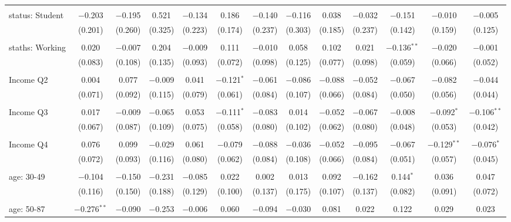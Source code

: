 \begin{tabular}{@{\extracolsep{5pt}}lcccccccccccc}
  & & & & & & & & & & & & \\ 
 status: Student & $-$0.203 & $-$0.195 & 0.521 & $-$0.134 & 0.186 & $-$0.140 & $-$0.116 & 0.038 & $-$0.032 & $-$0.151 & $-$0.010 & $-$0.005 \\ 
  & (0.201) & (0.260) & (0.325) & (0.223) & (0.174) & (0.237) & (0.303) & (0.185) & (0.237) & (0.142) & (0.159) & (0.125) \\ 
  & & & & & & & & & & & & \\ 
 staths: Working & 0.020 & $-$0.007 & 0.204 & $-$0.009 & 0.111 & $-$0.010 & 0.058 & 0.102 & 0.021 & $-$0.136$^{**}$ & $-$0.020 & $-$0.001 \\ 
  & (0.083) & (0.108) & (0.135) & (0.093) & (0.072) & (0.098) & (0.125) & (0.077) & (0.098) & (0.059) & (0.066) & (0.052) \\ 
  & & & & & & & & & & & & \\ 
 Income Q2 & 0.004 & 0.077 & $-$0.009 & 0.041 & $-$0.121$^{*}$ & $-$0.061 & $-$0.086 & $-$0.088 & $-$0.052 & $-$0.067 & $-$0.082 & $-$0.044 \\ 
  & (0.071) & (0.092) & (0.115) & (0.079) & (0.061) & (0.084) & (0.107) & (0.066) & (0.084) & (0.050) & (0.056) & (0.044) \\ 
  & & & & & & & & & & & & \\ 
 Income Q3 & 0.017 & $-$0.009 & $-$0.065 & 0.053 & $-$0.111$^{*}$ & $-$0.083 & 0.014 & $-$0.052 & $-$0.067 & $-$0.008 & $-$0.092$^{*}$ & $-$0.106$^{**}$ \\ 
  & (0.067) & (0.087) & (0.109) & (0.075) & (0.058) & (0.080) & (0.102) & (0.062) & (0.080) & (0.048) & (0.053) & (0.042) \\ 
  & & & & & & & & & & & & \\ 
 Income Q4 & 0.076 & 0.099 & $-$0.029 & 0.061 & $-$0.079 & $-$0.088 & $-$0.036 & $-$0.052 & $-$0.095 & $-$0.067 & $-$0.129$^{**}$ & $-$0.076$^{*}$ \\ 
  & (0.072) & (0.093) & (0.116) & (0.080) & (0.062) & (0.084) & (0.108) & (0.066) & (0.084) & (0.051) & (0.057) & (0.045) \\ 
  & & & & & & & & & & & & \\ 
 age: 30-49 & $-$0.104 & $-$0.150 & $-$0.231 & $-$0.085 & 0.022 & 0.002 & 0.013 & 0.092 & $-$0.162 & 0.144$^{*}$ & 0.036 & 0.047 \\ 
  & (0.116) & (0.150) & (0.188) & (0.129) & (0.100) & (0.137) & (0.175) & (0.107) & (0.137) & (0.082) & (0.091) & (0.072) \\ 
  & & & & & & & & & & & & \\ 
 age: 50-87 & $-$0.276$^{**}$ & $-$0.090 & $-$0.253 & $-$0.006 & 0.060 & $-$0.094 & $-$0.030 & 0.081 & 0.022 & 0.122 & 0.029 & 0.023 \\ 

\end{tabular}
